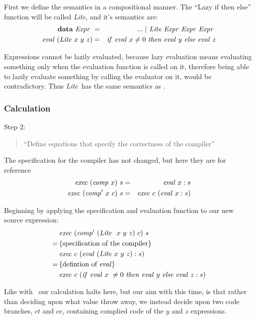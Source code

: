 \documentclass {article}
\begin{document}
\newcommand{\lite}{\textit{Lite}}
\newcommand{\Lite}{\mathit{Lite\ }}
First we define the semantics 
in a compositional manner.
The ``Lazy if then else'' function
 will be called \lite, and it's semantics are:
 \begin{eqnarray}
 \textbf{data}\ \Expr &=& ...\ |\ \Lite \Expr \Expr \Expr \nonumber \\
 \evalf (\Lite x\ y\ z)
	&=& \ifff \evalf  x \not= 0\ \tthen \evalf  y\ \eelse \evalf  z 
			\label{evallite}
 \end{eqnarray}

Expressions cannot be lazily evaluated,
because lazy evaluation means evaluating
something only when the evaluation function
is called on it,
therefore being able to lazily evaluate something 
by calling the evaluator on it,
would be contradictory.
Thus \lite\ has the same semantics
as \ite.

\subsubsection{Calculation}

Step 2:
\begin{quote}
``Define equations that specify the correctness of the compiler''
\end{quote}
The specification for the compiler has not
changed, but here they are for reference 
\begin{eqnarray}
\mathit{exec\ }  (\mathit{comp\ }  x)\  s &=& \mathit{eval\ }   x:s \label{spec1.3}\\
\mathit{exec\ }  (\mathit{comp'\ }   x\  c)\ s &=& \mathit{exec\ }  c\  (\mathit{eval\ }  x:s) \label{spec2.3}
\end{eqnarray}

Beginning by applying the 
specification and evaluation function
to our new source expression:
\begin{align*}
	&\Exec (\Compp  (\Lite\ x\ y\ z)\ c)\ s \\
	=\, & \{\mbox{specification of 
				the compiler} \} \\
	&\Exec c\ (\evalf  (\Lite x\ y\ z) : s) \\
	=\, & \{ \mbox{defintion of \eval} \} \\
	&\Exec c\ (\ifff \evalf  x\ \not= 0\ 
		\tthen \evalf  y\ \eelse \evalf  z : s)
\end{align*}

Like with \ite\ our calculation halts here,
but our aim with this time, is that 
rather than deciding upon what value throw away,
we instead decide upon two code branches, $ct$ and $ce$,
containing complied code of the $y$ and $z$ expressions.
\end{document}
